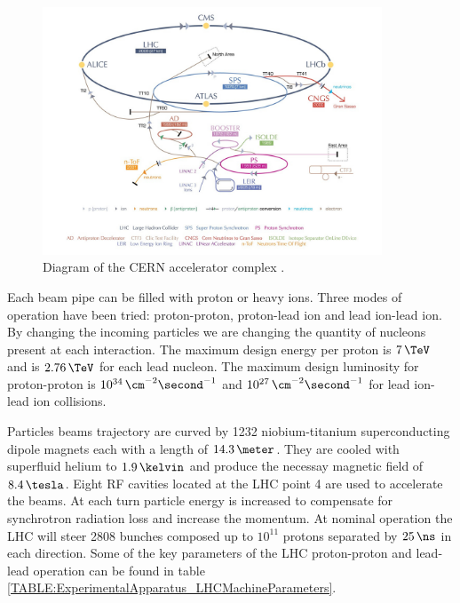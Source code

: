 \begin{figure}[!htb]
  \centering
  \includegraphics[width=0.90\textwidth]{Chapter02/LHC/Images/CERNAcceleratorComplex.jpg}
  \caption{Diagram of the \gls{CERN} accelerator complex \cite{IMAGEREF:CERNAcceleratorComplex}.}
  \label{FIGURE:ExperimentalApparatus_LHCAccelaratorChain}
\end{figure}

Each beam pipe can be filled with proton or heavy ions. Three modes of operation have been tried: proton-proton, proton-lead ion and lead ion-lead ion. By changing the incoming particles we are changing the quantity of nucleons present at each interaction. The maximum design energy per proton is $7\,\TeV$ and is $2.76\,\TeV$ for each lead nucleon. The maximum design luminosity for proton-proton is $10^{34}\,\cm^{-2}\second^{-1}$ and $10^{27}\,\cm^{-2}\second^{-1}$ for lead ion-lead ion collisions.

Particles beams trajectory are curved by 1232 niobium-titanium superconducting dipole magnets each with a length of $14.3\,\meter$. They are cooled with superfluid helium to $1.9\,\kelvin$ and produce the necessay magnetic field of $8.4\,\tesla$. Eight \gls{RF} cavities located at the \gls{LHC} point 4 are used to accelerate the beams. At each turn particle energy is increased to compensate for synchrotron radiation loss and increase the momentum. At nominal operation the \gls{LHC} will steer 2808 bunches composed up to $10^{11}$ protons separated by $25\,\ns$ in each direction. Some of the key parameters of the \gls{LHC} proton-proton and lead-lead operation can be found in table \ref{TABLE:ExperimentalApparatus_LHCMachineParameters}.

